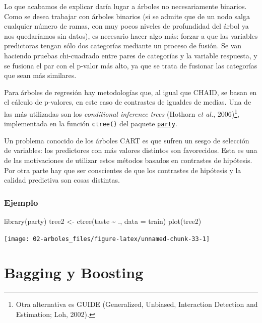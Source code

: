 \documentclass[
]{book}
\newenvironment{Shaded}{\begin{snugshade}}{\end{snugshade}}
\newcommand{\AttributeTok}[1]{\textcolor[rgb]{0.77,0.63,0.00}{#1}}
\newcommand{\FunctionTok}[1]{\textcolor[rgb]{0.00,0.00,0.00}{#1}}
\newcommand{\NormalTok}[1]{#1}
\newcommand{\OtherTok}[1]{\textcolor[rgb]{0.56,0.35,0.01}{#1}}
\newcommand{\SpecialCharTok}[1]{\textcolor[rgb]{0.00,0.00,0.00}{#1}}
\theoremstyle{break}
\theoremstyle{definition}
\theoremstyle{definition}
\theoremstyle{definition}
\theoremstyle{definition}
\theoremstyle{remark}
\begin{document}
Lo que acabamos de explicar daría lugar a árboles no necesariamente binarios.
Como se desea trabajar con árboles binarios (si se admite que de un nodo salga cualquier número de ramas, con muy pocos niveles de profundidad del árbol ya nos quedaríamos sin datos), es necesario hacer algo más: forzar a que las variables predictoras tengan sólo dos categorías mediante un proceso de fusión.
Se van haciendo pruebas chi-cuadrado entre pares de categorías y la variable respuesta, y se fusiona el par con el p-valor más alto, ya que se trata de fusionar las categorías que sean más similares.

Para árboles de regresión hay metodologías que, al igual que CHAID, se basan en el cálculo de p-valores, en este caso de contrastes de igualdes de medias.
Una de las más utilizadas son los \emph{conditional inference trees} (Hothorn \emph{et al.}, 2006)\footnote{Otra alternativa es GUIDE (Generalized, Unbiased, Interaction Detection and Estimation; Loh, 2002).}, implementada en la función \texttt{ctree()} del paquete \href{https://CRAN.R-project.org/package=party}{\texttt{party}}.

Un problema conocido de los árboles CART es que sufren un sesgo de selección de variables: los predictores con más valores distintos son favorecidos.
Esta es una de las motivaciones de utilizar estos métodos basados en contrastes de hipótesis.
Por otra parte hay que ser conscientes de que los contrastes de hipótesis y la calidad predictiva son cosas distintas.

\hypertarget{ejemplo-1}{%
\subsection{Ejemplo}\label{ejemplo-1}}

\begin{Shaded}
\begin{Highlighting}[]
\FunctionTok{library}\NormalTok{(party)}
\NormalTok{tree2 }\OtherTok{\textless{}{-}} \FunctionTok{ctree}\NormalTok{(taste }\SpecialCharTok{\textasciitilde{}}\NormalTok{ ., }\AttributeTok{data =}\NormalTok{ train) }
\FunctionTok{plot}\NormalTok{(tree2)}
\end{Highlighting}
\end{Shaded}

\begin{center}\texttt{[image: 02-arboles\_files/figure-latex/unnamed-chunk-33-1]} \end{center}

\hypertarget{bagging-boosting}{%
\chapter{Bagging y Boosting}\label{bagging-boosting}}
\end{document}
